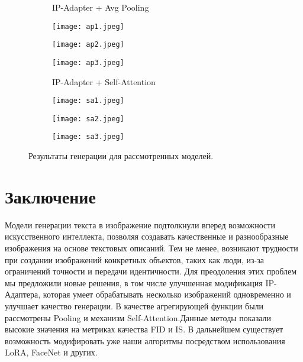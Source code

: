\documentclass{article}
\begin{document}
\begin{figure}[H]
\vspace{-25pt}

\begin{figure}[H]
\begin{minipage}{.25\textwidth}
    \centering
    IP-Adapter + Avg Pooling
    \label{fig:mp0}
\end{minipage}%
\begin{minipage}{.25\textwidth}
    \centering
    \texttt{[image: ap1.jpeg]}
    \label{fig:ap1}
\end{minipage}%
\begin{minipage}{.25\textwidth}
    \centering
    \texttt{[image: ap2.jpeg]}
    \label{fig:ap2}
\end{minipage}%
\begin{minipage}{.25\textwidth}
    \centering
    \texttt{[image: ap3.jpeg]}
    \label{fig:ap3}
\end{minipage}%
\end{figure}

\vspace{-25pt}

\begin{figure}[H]
\begin{minipage}{.25\textwidth}
    \centering
    IP-Adapter + Self-Attention
    \label{fig:sa0}
\end{minipage}%
\begin{minipage}{.25\textwidth}
    \centering
    \texttt{[image: sa1.jpeg]}
    \label{fig:sa1}
\end{minipage}%
\begin{minipage}{.25\textwidth}
    \centering
    \texttt{[image: sa2.jpeg]}
    \label{fig:sa2}
\end{minipage}%
\begin{minipage}{.25\textwidth}
    \centering
    \texttt{[image: sa3.jpeg]}
    \label{fig:sa3}
\end{minipage}%
\end{figure}
\caption{Результаты генерации для рассмотренных моделей.}
\end{figure}

\section{Заключение}
Модели генерации текста в изображение подтолкнули вперед возможности искусственного интеллекта, позволяя создавать качественные и разнообразные изображения на основе текстовых описаний. Тем не менее, возникают трудности при создании изображений конкретных объектов, таких как люди, из-за ограничений точности и передачи идентичности. Для преодоления этих проблем мы предложили новые решения, в том числе улучшенная модификация IP-Адаптера, которая умеет обрабатывать несколько изображений одновременно и улучшает качество генерации. В качестве агрегирующей функции были рассмотрены Pooling и механизм Self-Attention.Данные методы показали высокие значения на метриках качества FID и IS. В дальнейшем существует возможность модифировать уже наши алгоритмы посредством использования LoRA\cite{7}, FaceNet\cite{6}  и других.
\end{document}
